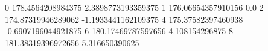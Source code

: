 0 178.4564208984375 2.3898773193359375
1 176.06654357910156 0.0
2 174.87319946289062 -1.1933441162109375
4 175.37582397460938 -0.6907196044921875
6 180.17469787597656 4.108154296875
8 181.38319396972656 5.316650390625
